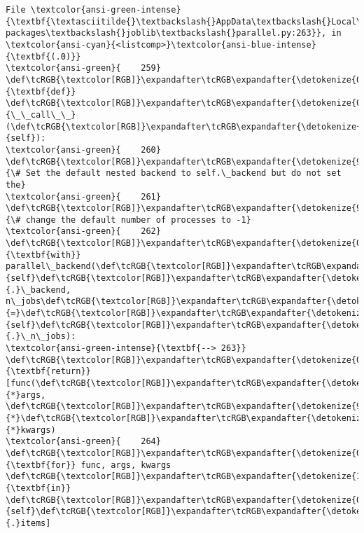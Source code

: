 \documentclass[11pt]{article}
\begin{document}
\begin{Verbatim}[commandchars=\\\{\}, frame=single, framerule=2mm, rulecolor=\color{outerrorbackground}]
File \textcolor{ansi-green-intense}{\textbf{\textasciitilde{}\textbackslash{}AppData\textbackslash{}Local\textbackslash{}anaconda3\textbackslash{}lib\textbackslash{}site-packages\textbackslash{}joblib\textbackslash{}parallel.py:263}}, in \textcolor{ansi-cyan}{<listcomp>}\textcolor{ansi-blue-intense}{\textbf{(.0)}}
\textcolor{ansi-green}{    259} \def\tcRGB{\textcolor[RGB]}\expandafter\tcRGB\expandafter{\detokenize{0,135,0}}{\textbf{def}} \def\tcRGB{\textcolor[RGB]}\expandafter\tcRGB\expandafter{\detokenize{0,0,255}}{\_\_call\_\_}(\def\tcRGB{\textcolor[RGB]}\expandafter\tcRGB\expandafter{\detokenize{0,135,0}}{self}):
\textcolor{ansi-green}{    260}     \def\tcRGB{\textcolor[RGB]}\expandafter\tcRGB\expandafter{\detokenize{95,135,135}}{\# Set the default nested backend to self.\_backend but do not set the}
\textcolor{ansi-green}{    261}     \def\tcRGB{\textcolor[RGB]}\expandafter\tcRGB\expandafter{\detokenize{95,135,135}}{\# change the default number of processes to -1}
\textcolor{ansi-green}{    262}     \def\tcRGB{\textcolor[RGB]}\expandafter\tcRGB\expandafter{\detokenize{0,135,0}}{\textbf{with}} parallel\_backend(\def\tcRGB{\textcolor[RGB]}\expandafter\tcRGB\expandafter{\detokenize{0,135,0}}{self}\def\tcRGB{\textcolor[RGB]}\expandafter\tcRGB\expandafter{\detokenize{98,98,98}}{.}\_backend, n\_jobs\def\tcRGB{\textcolor[RGB]}\expandafter\tcRGB\expandafter{\detokenize{98,98,98}}{=}\def\tcRGB{\textcolor[RGB]}\expandafter\tcRGB\expandafter{\detokenize{0,135,0}}{self}\def\tcRGB{\textcolor[RGB]}\expandafter\tcRGB\expandafter{\detokenize{98,98,98}}{.}\_n\_jobs):
\textcolor{ansi-green-intense}{\textbf{--> 263}}         \def\tcRGB{\textcolor[RGB]}\expandafter\tcRGB\expandafter{\detokenize{0,135,0}}{\textbf{return}} [func(\def\tcRGB{\textcolor[RGB]}\expandafter\tcRGB\expandafter{\detokenize{98,98,98}}{*}args, \def\tcRGB{\textcolor[RGB]}\expandafter\tcRGB\expandafter{\detokenize{98,98,98}}{*}\def\tcRGB{\textcolor[RGB]}\expandafter\tcRGB\expandafter{\detokenize{98,98,98}}{*}kwargs)
\textcolor{ansi-green}{    264}                 \def\tcRGB{\textcolor[RGB]}\expandafter\tcRGB\expandafter{\detokenize{0,135,0}}{\textbf{for}} func, args, kwargs \def\tcRGB{\textcolor[RGB]}\expandafter\tcRGB\expandafter{\detokenize{175,0,255}}{\textbf{in}} \def\tcRGB{\textcolor[RGB]}\expandafter\tcRGB\expandafter{\detokenize{0,135,0}}{self}\def\tcRGB{\textcolor[RGB]}\expandafter\tcRGB\expandafter{\detokenize{98,98,98}}{.}items]


\end{Verbatim}
\end{document}
